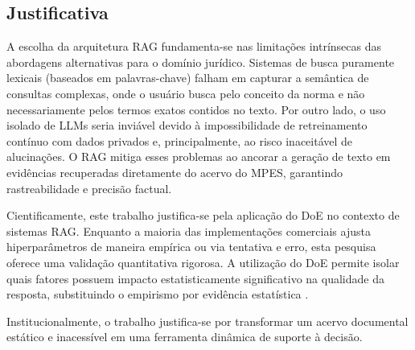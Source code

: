 \subsection{Justificativa}

A escolha da arquitetura RAG fundamenta-se nas limitações intrínsecas das abordagens alternativas para o domínio jurídico. Sistemas de busca puramente lexicais (baseados em palavras-chave) falham em capturar a semântica de consultas complexas, onde o usuário busca pelo conceito da norma e não necessariamente pelos termos exatos contidos no texto. Por outro lado, o uso isolado de LLMs seria inviável devido à impossibilidade de retreinamento contínuo com dados privados e, principalmente, ao risco inaceitável de alucinações. O RAG mitiga esses problemas ao ancorar a geração de texto em evidências recuperadas diretamente do acervo do MPES, garantindo rastreabilidade e precisão factual.

Cientificamente, este trabalho justifica-se pela aplicação do DoE no contexto de sistemas RAG. Enquanto a maioria das implementações comerciais ajusta hiperparâmetros de maneira empírica ou via tentativa e erro, esta pesquisa oferece uma validação quantitativa rigorosa. A utilização do DoE permite isolar quais fatores possuem impacto estatisticamente significativo na qualidade da resposta, substituindo o empirismo por evidência estatística \citep{montgomery2017, wang2024}.

Institucionalmente, o trabalho justifica-se por transformar um acervo documental estático e inacessível em uma ferramenta dinâmica de suporte à decisão.
